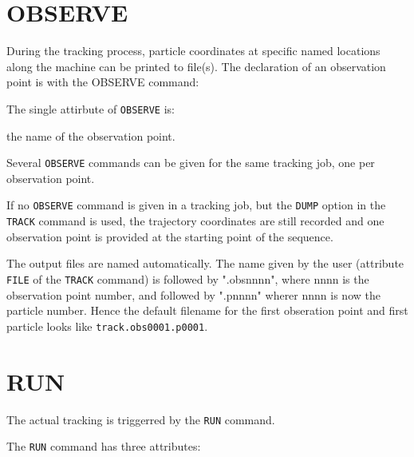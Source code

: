 \section{OBSERVE}
\label{sec:observe}

During the tracking process, particle coordinates at specific named
locations along the machine can be printed to file(s). The declaration of
an observation point is with the OBSERVE command: 


The single attirbute of \texttt{OBSERVE} is:
\begin{madlist}
   the name of the observation point. 
\end{madlist}

     

Several \texttt{OBSERVE} commands can be given for the same tracking
job, one per observation point. 

If no \texttt{OBSERVE} command is given in a tracking job, but the
\texttt{DUMP} option in the \texttt{TRACK} command is used, the
trajectory coordinates are still recorded and one observation point is
provided at the starting point of the sequence. 
     
The output files are named automatically. The name given by
the user (attribute \texttt{FILE} of the \texttt{TRACK} command) is
followed by ".obsnnnn", where nnnn is the observation point number, and followed by 
".pnnnn"  wherer nnnn is now the particle number. Hence the default
filename for the first obseration point and first particle looks like
\texttt{track.obs0001.p0001}.


\section{RUN}
\label{sec:run}

The actual tracking is triggerred by the \texttt{RUN} command. 


The \texttt{RUN} command has three attributes:  
     
